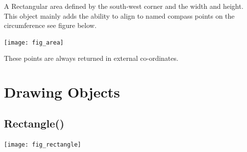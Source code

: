 \documentclass[a4paper]{book}
\begin{document}
A Rectangular area defined by the south-west corner and the width and height.
This object mainly adds the ability to align to named compass points on the 
circumference see figure below.

\begin{center}
  \texttt{[image: fig\_area]}
\end{center}

These points are always returned in external co-ordinates.

\section{Drawing Objects}

\subsection{Rectangle()}
\label{sec:rectangle}

\begin{center}
  \texttt{[image: fig\_rectangle]}
\end{center}

\end{document}
